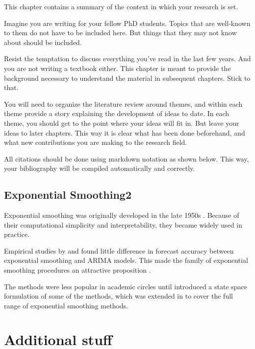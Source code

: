 \documentclass{umagthesis}
\begin{document}
This chapter contains a summary of the context in which your research is set.

Imagine you are writing for your fellow PhD students. Topics that are well-known to them do not have to be included here. But things that they may not know about should be included.

Resist the temptation to discuss everything you've read in the last few years. And you are not writing a textbook either. This chapter is meant to provide the background necessary to understand the material in subsequent chapters. Stick to that.

You will need to organize the literature review around themes, and within each theme provide a story explaining the development of ideas to date. In each theme, you should get to the point where your ideas will fit in. But leave your ideas to later chapters. This way it is clear what has been done beforehand, and what new contributions you are making to the research field.

All citations should be done using markdown notation as shown below. This way, your bibliography will be compiled automatically and correctly.

\hypertarget{sec:expsmooth2}{%
\section{Exponential Smoothing2}\label{sec:expsmooth2}}

Exponential smoothing was originally developed in the late 1950s \autocite{Brown59,Brown63,Holt57,Winters60}. Because of their computational simplicity and interpretability, they became widely used in practice.

Empirical studies by \textcite{MH79} and \textcite{Metal82} found little difference in forecast accuracy between exponential smoothing and ARIMA models. This made the family of exponential smoothing procedures an attractive proposition \autocite[see][]{CKOS01}.

The methods were less popular in academic circles until \textcite{OKS97} introduced a state space formulation of some of the methods, which was extended in \textcite{HKSG02} to cover the full range of exponential smoothing methods.

\appendix

\hypertarget{additional-stuff}{%
\chapter{Additional stuff}\label{additional-stuff}}
\end{document}
